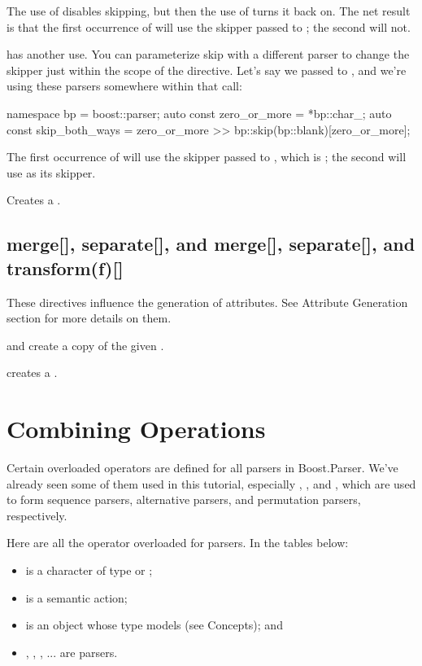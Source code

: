 \documentclass{MyBook}
\begin{document}
The use of  disables skipping, but then the use of  turns it back on. The net result is that the first occurrence of  will use the skipper passed to ; the second will not.

 has another use. You can parameterize skip with a different parser to change the skipper just within the scope of the directive. Let's say we passed  to , and we're using these parsers somewhere within that  call:

\begin{code}
namespace bp = boost::parser;
auto const zero_or_more = *bp::char_;
auto const skip_both_ways = zero_or_more >> bp::skip(bp::blank)[zero_or_more];
\end{code}

The first occurrence of  will use the skipper passed to , which is ; the second will use  as its skipper.

Creates a .

\subsection{{merge{[}{]}, separate{[}{]}, and }{merge{[}{]}, separate{[}{]}, and transform(f){[}{]}}}

These directives influence the generation of attributes. See Attribute Generation section for more details on them.

 and  create a copy of the given .

 creates a .

\section{Combining Operations}

Certain overloaded operators are defined for all parsers in Boost.Parser. We've already seen some of them used in this tutorial, especially , , and , which are used to form sequence parsers, alternative parsers, and permutation parsers, respectively.

Here are all the operator overloaded for parsers. In the tables below:

\begin{itemize}
\item
   is a character of type  or ;
\item
   is a semantic action;
\item
   is an object whose type models  (see Concepts); and
\item
  , , , ... are parsers.
\end{itemize}
\end{document}
